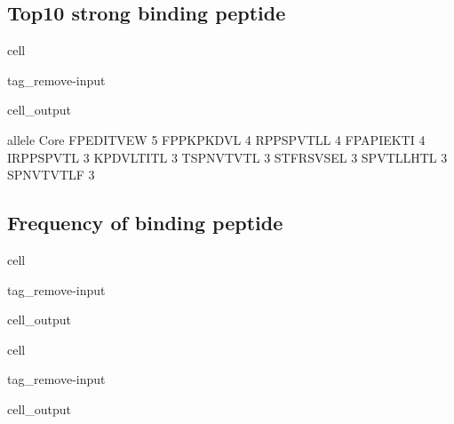 \documentclass[letterpaper,10pt,english]{jupyterBook}
\begin{document}
\subsection{Top10 strong binding peptide}
\label{\detokenize{ipynb/chapter2:top10-strong-binding-peptide}}
\begin{sphinxuseclass}{cell}
\begin{sphinxuseclass}{tag_remove-input}\begin{sphinxVerbatimOutput}

\begin{sphinxuseclass}{cell_output}
\begin{sphinxVerbatim}[commandchars=\\\{\}]
           allele
Core             
FPEDITVEW       5
FPPKPKDVL       4
RPPSPVTLL       4
FPAPIEKTI       4
IRPPSPVTL       3
KPDVLTITL       3
TSPNVTVTL       3
STFRSVSEL       3
SPVTLLHTL       3
SPNVTVTLF       3
\end{sphinxVerbatim}

\end{sphinxuseclass}\end{sphinxVerbatimOutput}

\end{sphinxuseclass}
\end{sphinxuseclass}

\subsection{Frequency of binding peptide}
\label{\detokenize{ipynb/chapter2:frequency-of-binding-peptide}}
\begin{sphinxuseclass}{cell}
\begin{sphinxuseclass}{tag_remove-input}\begin{sphinxVerbatimOutput}

\begin{sphinxuseclass}{cell_output}
\noindent{}

\end{sphinxuseclass}\end{sphinxVerbatimOutput}

\end{sphinxuseclass}
\end{sphinxuseclass}
\begin{sphinxuseclass}{cell}
\begin{sphinxuseclass}{tag_remove-input}\begin{sphinxVerbatimOutput}

\begin{sphinxuseclass}{cell_output}
\noindent{}

\end{sphinxuseclass}\end{sphinxVerbatimOutput}

\end{sphinxuseclass}
\end{sphinxuseclass}
\end{document}
